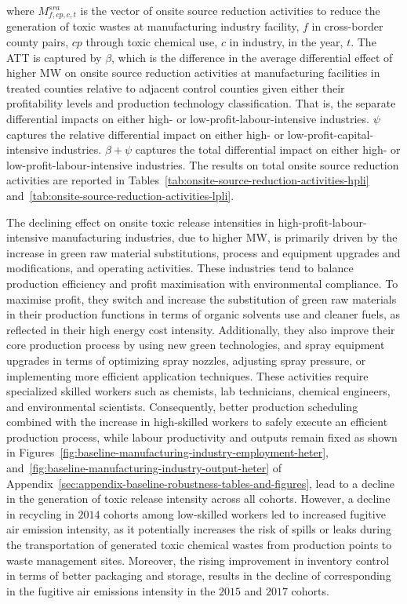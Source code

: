 \documentclass{C:/Users/david/OneDrive/Documents/ULMS/PhD/Thesis/chapter3/src/climate_change/latex/Economic_Journal/OUP-EJ}
\begin{document}
    where $M_{f,cp,c,t}^{sra}$ is the vector of onsite source reduction activities to reduce the generation of toxic wastes at manufacturing industry facility, $f$ in cross-border county pairs, $cp$ through toxic chemical use, $c$ in industry, in the year, $t$. The ATT is captured by $\beta$, which is the difference in the average differential effect of higher MW on onsite source reduction activities at manufacturing facilities in treated counties relative to adjacent control counties given either their profitability levels and production technology classification. That is, the separate differential impacts on either high- or low-profit-labour-intensive industries. $\psi$ captures the relative differential impact on either high- or low-profit-capital-intensive industries. $\beta + \psi$ captures the total differential impact on either high- or low-profit-labour-intensive industries. The results on total onsite source reduction activities are reported in Tables~\ref{tab:onsite-source-reduction-activities-hpli} and~\ref{tab:onsite-source-reduction-activities-lpli}.

    The declining effect on onsite toxic release intensities in high-profit-labour-intensive manufacturing industries, due to higher MW, is primarily driven by the increase in green raw material substitutions, process and equipment upgrades and modifications, and operating activities. These industries tend to balance production efficiency and profit maximisation with environmental compliance. To maximise profit, they switch and increase the substitution of green raw materials in their production functions in terms of organic solvents use and cleaner fuels, as reflected in their high energy cost intensity. Additionally, they also improve their core production process by using new green technologies, and spray equipment upgrades in terms of optimizing spray nozzles, adjusting spray pressure, or implementing more efficient application techniques. These activities require specialized skilled workers such as chemists, lab technicians, chemical engineers, and environmental scientists. Consequently, better production scheduling combined with the increase in high-skilled workers to safely execute an efficient production process, while labour productivity and outputs remain fixed as shown in Figures~\ref{fig:baseline-manufacturing-industry-employment-heter}, and~\ref{fig:baseline-manufacturing-industry-output-heter} of Appendix~\ref{sec:appendix-baseline-robustness-tables-and-figures}, lead to a decline in the generation of toxic release intensity across all cohorts. However, a decline in recycling in $2014$ cohorts among low-skilled workers led to increased fugitive air emission intensity, as it potentially increases the risk of spills or leaks during the transportation of generated toxic chemical wastes from production points to waste management sites. Moreover, the rising improvement in inventory control in terms of better packaging and storage, results in the decline of corresponding in the fugitive air emissions intensity in the $2015$ and $2017$ cohorts.
    
\end{document}
